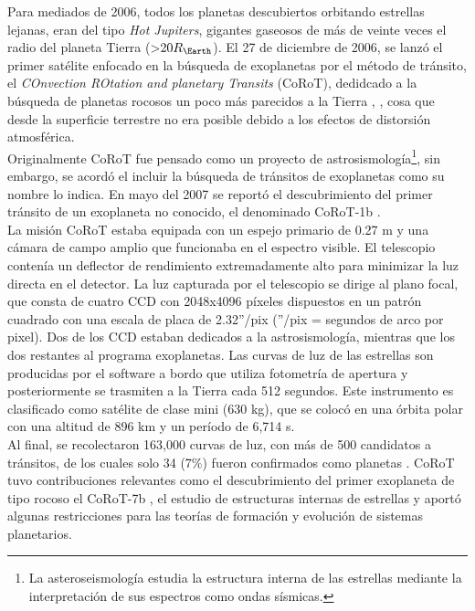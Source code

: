 Para mediados de 2006, todos los planetas descubiertos orbitando estrellas lejanas, eran del tipo \textit{Hot Jupiters}, gigantes gaseosos de más de veinte veces el radio del planeta Tierra (>$20R_{\Earth}$). El 27 de diciembre de 2006, se lanzó el primer satélite enfocado en la búsqueda de exoplanetas por el método de tránsito, el \textit{COnvection ROtation and planetary Transits} (CoRoT), dedidcado a la búsqueda de planetas rocosos un poco más parecidos a la Tierra \cite{aigrain2007corot}, \cite{barge2007corot}, cosa que desde la superficie terrestre no era posible debido a los efectos de distorsión atmosférica.\\

Originalmente CoRoT fue pensado como un proyecto de astrosismología\footnote{La asteroseismología estudia la estructura interna de las estrellas mediante la interpretación de sus espectros como ondas sísmicas.}, sin embargo, se acordó el incluir la búsqueda de tránsitos de exoplanetas como su nombre lo indica. En mayo del 2007 se reportó el descubrimiento del primer tránsito de un exoplaneta no conocido, el denominado CoRoT-1b \cite{barge2008transiting}. \\

La misión CoRoT estaba equipada con un espejo primario de 0.27 m  y una cámara de campo amplio que funcionaba en el espectro visible. El telescopio contenía un deflector de rendimiento extremadamente alto para minimizar la luz directa en el detector. La luz capturada por el telescopio se dirige al plano focal, que consta de cuatro CCD con 2048x4096 píxeles dispuestos en un patrón cuadrado con una escala de placa de 2.32''/pix (''/pix = segundos de arco por pixel). Dos de los CCD estaban dedicados a la astrosismología, mientras que los dos restantes al programa exoplanetas. Las curvas de luz de las estrellas son producidas por el software a bordo que utiliza fotometría de apertura y posteriormente se trasmiten a la Tierra cada 512 segundos. Este instrumento es clasificado como satélite de clase mini (630 kg), que se colocó en una órbita polar con una altitud de 896 km y un período de 6,714 s.\\

Al final, se recolectaron 163,000 curvas de luz, con más de 500 candidatos a tránsitos, de los cuales solo 34 (7\%) fueron confirmados como planetas \citep{moutou2013corot}. CoRoT tuvo contribuciones relevantes como el descubrimiento del primer exoplaneta de tipo rocoso el CoRoT-7b \citep{leger2009transiting}, el estudio de estructuras internas de estrellas y aportó algunas restricciones para las teorías de formación y evolución de sistemas planetarios.

